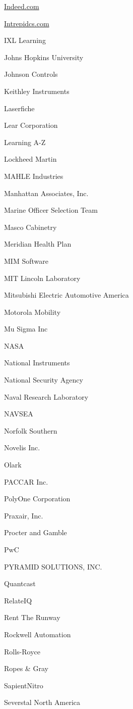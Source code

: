 \documentclass[twoside]{article}
\begin{document}
\begin{center}
\begin{multicols}{5}
\begin{FlushLeft}
\begin{compactitem}
\item \url{Indeed.com}
\item \url{Intrepidcs.com}
\item IXL Learning
\item Johns Hopkins University
\item Johnson Controls
\item Keithley Instruments
\item Laserfiche
\item Lear Corporation
\item Learning A-Z
\item Lockheed Martin
\item MAHLE Industries
\item Manhattan Associates, Inc.
\item Marine Officer Selection Team
\item Masco Cabinetry
\item Meridian Health Plan
\item MIM Software
\item MIT Lincoln Laboratory
\item Mitsubishi Electric Automotive America
\item Motorola Mobility
\item Mu Sigma Inc
\item NASA
\item National Instruments
\item National Security Agency
\item Naval Research Laboratory
\item NAVSEA
\item Norfolk Southern
\item Novelis Inc.
\item Olark
\item PACCAR Inc.
\item PolyOne Corporation
\item Praxair, Inc.
\item Procter and Gamble
\item PwC
\item PYRAMID SOLUTIONS, INC.
\item Quantcast
\item RelateIQ
\item Rent The Runway
\item Rockwell Automation
\item Rolls-Royce
\item Ropes \& Gray
\item SapientNitro
\item Severstal North America

\end{compactitem}
\end{FlushLeft}
\end{multicols}
\end{center}
\end{document}
